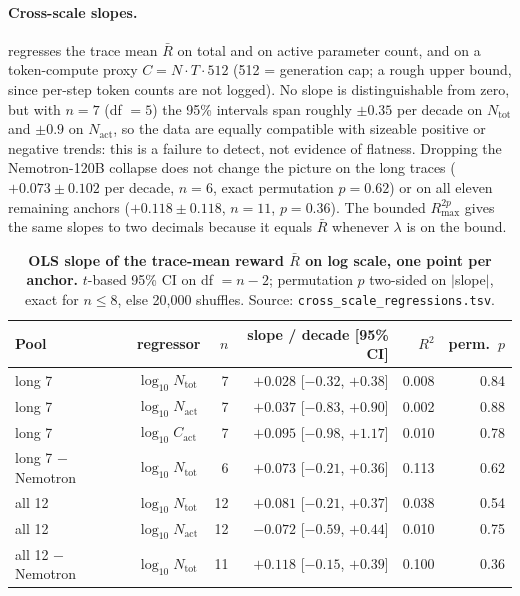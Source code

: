 \paragraph{Cross-scale slopes.}
 regresses the trace mean $\bar R$ on
total and on active parameter count, and on a token-compute proxy
$C = N\cdot T\cdot 512$ (512 = generation cap; a rough upper bound,
since per-step token counts are not logged).  No slope is
distinguishable from zero, but with $n=7$ (df $=5$) the 95\% intervals
span roughly $\pm 0.35$ per decade on $N_{\text{tot}}$ and $\pm 0.9$ on
$N_{\text{act}}$, so the data are equally compatible with sizeable
positive or negative trends: this is a failure to detect, not evidence
of flatness.  Dropping the Nemotron-120B collapse does not change the
picture on the long traces ($+0.073 \pm 0.102$ per decade, $n=6$,
exact permutation $p = 0.62$) or on all eleven remaining anchors
($+0.118 \pm 0.118$, $n=11$, $p = 0.36$).  The bounded $R_{\max}^{2p}$
gives the same slopes to two decimals because it equals $\bar R$
whenever $\lambda$ is on the bound.

\begin{table}[t]
  \centering
  \small
  \begin{tabular}{llrrrr}
    \toprule
    Pool & regressor & $n$ & slope / decade [95\% CI] & $R^2$ & perm.\ $p$ \\
    \midrule
    long 7  & $\log_{10} N_{\text{tot}}$ & 7  & $+0.028$ [$-0.32$, $+0.38$] & 0.008 & 0.84 \\
    long 7  & $\log_{10} N_{\text{act}}$ & 7  & $+0.037$ [$-0.83$, $+0.90$] & 0.002 & 0.88 \\
    long 7  & $\log_{10} C_{\text{act}}$ & 7  & $+0.095$ [$-0.98$, $+1.17$] & 0.010 & 0.78 \\
    long 7 $-$ Nemotron & $\log_{10} N_{\text{tot}}$ & 6 & $+0.073$ [$-0.21$, $+0.36$] & 0.113 & 0.62 \\
    all 12  & $\log_{10} N_{\text{tot}}$ & 12 & $+0.081$ [$-0.21$, $+0.37$] & 0.038 & 0.54 \\
    all 12  & $\log_{10} N_{\text{act}}$ & 12 & $-0.072$ [$-0.59$, $+0.44$] & 0.010 & 0.75 \\
    all 12 $-$ Nemotron & $\log_{10} N_{\text{tot}}$ & 11 & $+0.118$ [$-0.15$, $+0.39$] & 0.100 & 0.36 \\
    \bottomrule
  \end{tabular}
  \caption{\textbf{OLS slope of the trace-mean reward $\bar R$ on log
    scale, one point per anchor.}  $t$-based 95\% CI on df $=n-2$;
    permutation $p$ two-sided on $|$slope$|$, exact for $n \le 8$, else
    20{,}000 shuffles.  Source: \texttt{cross\_scale\_regressions.tsv}.}
  \label{tab:p1-rawtrace-slopes}
\end{table}

